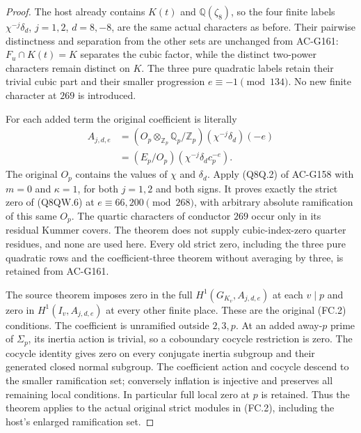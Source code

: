\begin{proof}
The host already contains $K(t)$ and $\mathbb Q(\zeta_8)$,
so the four finite labels $\chi^{-j}\delta_d$, $j=1,2$,
$d=8,-8$, are the same actual characters as before.
Their pairwise distinctness and separation from the other
sets are unchanged from AC-G161: $F_u\cap K(t)=K$ separates
the cubic factor, while the distinct two-power characters
remain distinct on $K$.
The three pure quadratic labels retain their trivial cubic part
and their smaller progression $e\equiv-1\pmod{134}$.
No new finite character at $269$ is introduced.

For each added term the original coefficient is literally
\[
 \begin{aligned}
 A_{j,d,e}&=(O_p\otimes_{\mathbb Z_p}\mathbb Q_p/\mathbb Z_p)
                                               (\chi^{-j}\delta_d)(-e)\\
         &=(E_p/O_p)(\chi^{-j}\delta_dc_p^{-e}).
 \end{aligned}
 \tag{Q8QW.6}
\]
The original $O_p$ contains the values of $\chi$ and $\delta_d$.
Apply (Q8Q.2) of AC-G158 with $m=0$ and $\kappa=1$,
for both $j=1,2$ and both signs.
It proves exactly the strict zero of (Q8QW.6) at
$e\equiv66,200\pmod{268}$, with arbitrary absolute
ramification of this same $O_p$.
The quartic characters of conductor $269$ occur only in its
residual Kummer covers.
The theorem does not supply cubic-index-zero quarter residues,
and none are used here.
Every old strict zero, including the three pure quadratic rows
and the coefficient-three theorem without averaging by three,
is retained from AC-G161.

The source theorem imposes zero in the full
$H^1(G_{K_v},A_{j,d,e})$ at each $v\mid p$ and zero in
$H^1(I_v,A_{j,d,e})$ at every other finite place.
These are the original (FC.2) conditions.
The coefficient is unramified outside $2,3,p$.
At an added away-$p$ prime of $\Sigma_p$, its inertia action is
trivial, so a coboundary cocycle restriction is zero.
The cocycle identity gives zero on every conjugate inertia
subgroup and their generated closed normal subgroup.
The coefficient action and cocycle descend to the smaller
ramification set; conversely inflation is injective and preserves
all remaining local conditions.  In particular full local zero
at $p$ is retained.
Thus the theorem applies to the actual original strict modules
in (FC.2), including the host's enlarged ramification set.


\end{proof}
